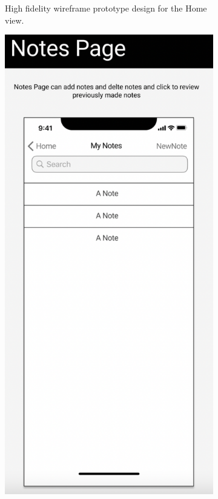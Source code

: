 \documentclass{l4proj}
\begin{document}
\begin{appendices}
\begin{figure}[H]
\begin{subfigure}[b]{0.3\textwidth}
        \caption{High fidelity wireframe prototype design for the Home view.}
        \label{fig:HomeWireframe}
    \end{subfigure}
    \begin{subfigure}[b]{0.3\textwidth}
        \includegraphics[scale=0.3]{images/NotesWireframe.pdf}

\end{subfigure}
\end{figure}
\end{appendices}
\end{document}
